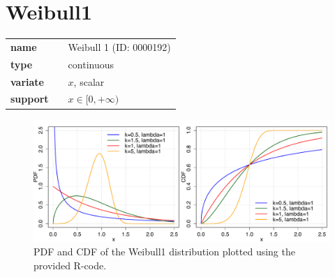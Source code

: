 %
%
%
\smallskip\section*{Weibull1} 

  \bigskip 

\begin{tabular}{p{2cm}cl}
\textbf{name} & & Weibull 1 (ID: 0000192)\\ 
 
\textbf{type} & & continuous \\ 

\textbf{variate} & & $x$, scalar \\ 

\textbf{support} & & $x \in [0,+\infty)$
\end{tabular}
\begin{figure}[htb!]
\centering
  \includegraphics[width=140mm]{pics/Weibull1_pdf_cdf.pdf}
 \caption{PDF and CDF of the Weibull1 distribution plotted using the provided R-code.}
 \label{fig:Weibull1pdfcdf}
\end{figure}
